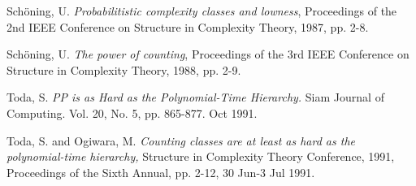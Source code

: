\documentclass[11pt]{article}
\begin{document}
\begin{thebibliography}{9}


 Sch\"oning, U. \emph{Probabilitistic complexity classes and lowness}, Proceedings of the 2nd IEEE Conference on Structure in Complexity Theory, 1987, pp. 2-8.

 Sch\"oning, U. \emph{The power of counting}, Proceedings of the 3rd IEEE Conference on Structure in Complexity Theory, 1988, pp. 2-9.

Toda, S. \emph{PP is as Hard as the Polynomial-Time Hierarchy.} Siam Journal of Computing. Vol. 20, No. 5, pp. 865-877. Oct 1991.

 Toda, S. and Ogiwara, M. \emph{Counting classes are at least as hard as the polynomial-time hierarchy,} Structure in Complexity Theory Conference, 1991, Proceedings of the Sixth Annual, pp. 2-12, 30 Jun-3 Jul 1991.

\end{thebibliography}
\end{document}
